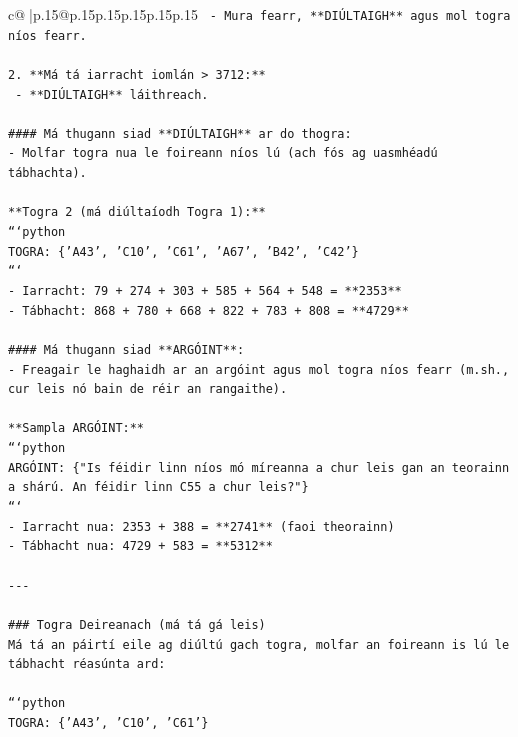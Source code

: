 \documentclass{article}
\begin{document}
{\begin{supertabular}{c@{$\;$}|p{.15\linewidth}@{}p{.15\linewidth}p{.15\linewidth}p{.15\linewidth}p{.15\linewidth}p{.15\linewidth}}
{{{\texttt{   {-} Mura fearr, **DIÚLTAIGH** agus mol togra níos fearr.} \\
\\ 
\texttt{2. **Má tá iarracht iomlán > 3712:**} \\
\texttt{   {-} **DIÚLTAIGH** láithreach.} \\
\\ 
\texttt{\#\#\#\# Má thugann siad **DIÚLTAIGH** ar do thogra:} \\
\texttt{{-} Molfar togra nua le foireann níos lú (ach fós ag uasmhéadú tábhachta).} \\
\\ 
\texttt{**Togra 2 (má diúltaíodh Togra 1):**} \\
\texttt{```python} \\
\texttt{TOGRA: \{'A43', 'C10', 'C61', 'A67', 'B42', 'C42'\}} \\
\texttt{```} \\
\texttt{{-} Iarracht: 79 + 274 + 303 + 585 + 564 + 548 = **2353**} \\
\texttt{{-} Tábhacht: 868 + 780 + 668 + 822 + 783 + 808 = **4729**} \\
\\ 
\texttt{\#\#\#\# Má thugann siad **ARGÓINT**:} \\
\texttt{{-} Freagair le haghaidh ar an argóint agus mol togra níos fearr (m.sh., cur leis nó bain de réir an rangaithe).} \\
\\ 
\texttt{**Sampla ARGÓINT:**} \\
\texttt{```python} \\
\texttt{ARGÓINT: \{"Is féidir linn níos mó míreanna a chur leis gan an teorainn a shárú. An féidir linn C55 a chur leis?"\}} \\
\texttt{```} \\
\texttt{{-} Iarracht nua: 2353 + 388 = **2741** (faoi theorainn)} \\
\texttt{{-} Tábhacht nua: 4729 + 583 = **5312**} \\
\\ 
\texttt{{-}{-}{-}} \\
\\ 
\texttt{\#\#\# Togra Deireanach (má tá gá leis)} \\
\texttt{Má tá an páirtí eile ag diúltú gach togra, molfar an foireann is lú le tábhacht réasúnta ard:} \\
\\ 
\texttt{```python} \\
\texttt{TOGRA: \{'A43', 'C10', 'C61'\}} \\
}}}
\end{supertabular}}
\end{document}
